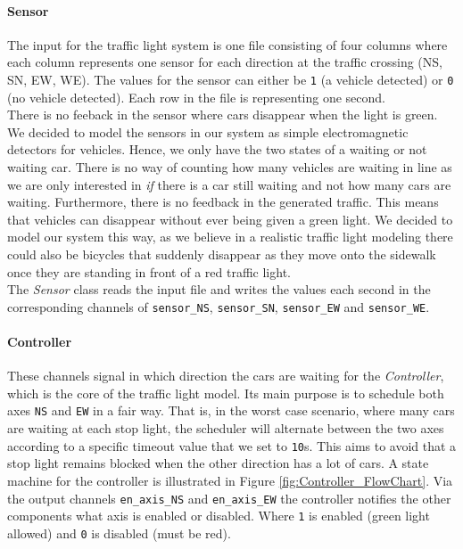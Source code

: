 \documentclass[10pt,bibliography=totocnumbered,listof=totocnumbered, footsepline, headsepline]{scrreprt}
\begin{document}
    \paragraph*{Sensor} The input for the traffic light system is one file consisting of four columns where each column represents one sensor for each direction at the traffic crossing (NS, SN, EW, WE). The values for the sensor can either be \texttt{1} (a vehicle detected) or \texttt{0} (no vehicle detected). Each row in the file is representing one second. \\
    There is no feeback in the sensor where cars disappear when the light is green. 
    We decided to model the sensors in our system as simple electromagnetic detectors for vehicles. Hence, we only have the two states of a waiting or not waiting car. There is no way of counting how many vehicles are waiting in line as we are only interested in \textit{if} there is a car still waiting and not how many cars are waiting. Furthermore, there is no feedback in the generated traffic. This means that vehicles can disappear without ever being given a green light. We decided to model our system this way, as we believe in a realistic traffic light modeling there could also be bicycles that suddenly disappear as they move onto the sidewalk once they are standing in front of a red traffic light.\\
    The \textit{Sensor} class reads the input file and writes the values each second in the corresponding channels of \texttt{sensor\_NS}, \texttt{sensor\_SN}, \texttt{sensor\_EW} and \texttt{sensor\_WE}.
    
    \paragraph*{Controller} These channels signal in which direction the cars are waiting for the \textit{Controller}, which is the core of the traffic light model. Its main purpose is to schedule both axes \texttt{NS} and \texttt{EW} in a fair way.
    That is, in the worst case scenario, where many cars are waiting at each stop light, the scheduler will alternate between the two axes according to a specific timeout value that we set to \texttt{10}s. This aims to avoid that a stop light remains blocked when the other direction has a lot of cars. A state machine for the controller is illustrated in Figure \ref{fig:Controller_FlowChart}. Via the output channels \texttt{en\_axis\_NS} and \texttt{en\_axis\_EW} the controller notifies the other components what axis is enabled or disabled. Where \texttt{1} is enabled (green light allowed) and \texttt{0} is disabled (must be red).
    
\end{document}

